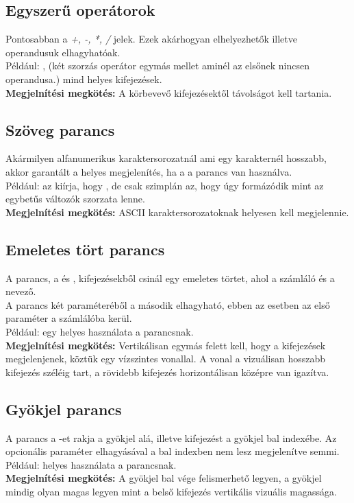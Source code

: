 \documentclass[../spec.tex]{subfiles}
\begin{document}
    \subsection{Egyszerű operátorok}\label{subsec:két-operandusu-egyszerű-operátorok}
    Pontosabban a \textit{+, -, *, /} jelek.
    Ezek akárhogyan elhelyezhetők illetve operandusuk elhagyhatóak. \\
    Például: \lang{[kif] + [kif]}, \lang{** [kif]} (két szorzás operátor egymás mellet aminél az elsőnek nincsen operandusa.) mind helyes kifejezések. \\
    \textbf{Megjelnítési megkötés:} A körbevevő kifejezésektől távolságot kell tartania.

    \subsection{Szöveg parancs}\label{subsec:szöveges-parancs}
    Akármilyen alfanumerikus karaktersorozatnál ami egy karakternél hosszabb, akkor garantált a helyes megjelenítés, ha a a  parancs van használva. \\
    Például:  az kiírja, hogy , de csak szimplán az, hogy  úgy formázódik mint az  egybetűs változók szorzata lenne.\\
    \textbf{Megjelnítési megkötés:} ASCII karaktersorozatoknak helyesen kell megjelennie.

    \subsection{Emeletes tört parancs}\label{subsec:emelett-parancs}
    A  parancs, a  és , kifejezésekből csinál egy emeletes törtet, ahol  a számláló és  a nevező.\\
    A parancs két paraméteréből a második elhagyható, ebben az esetben az első paraméter a számlálóba kerül.\\
    Például:  egy helyes használata a parancsnak.\\
    \textbf{Megjelnítési megkötés:} Vertikálisan egymás felett kell, hogy a kifejezések megjelenjenek, köztük egy vízszintes vonallal.
    A vonal a vizuálisan hosszabb kifejezés széléig tart, a rövidebb kifejezés horizontálisan középre van igazítva.

    \subsection{Gyökjel parancs}\label{subsec:gyökjel-parancs}
    A  parancs a -et rakja a gyökjel alá, illetve  kifejezést a gyökjel bal indexébe.
    Az opcionális paraméter elhagyásával a bal indexben nem lesz megjelenítve semmi.\\
    Például:  helyes használata a parancsnak.\\
    \textbf{Megjelnítési megkötés:} A gyökjel bal vége felismerhető legyen, a gyökjel mindig olyan magas legyen mint a belső kifejezés vertikális vizuális magassága.
\end{document}
